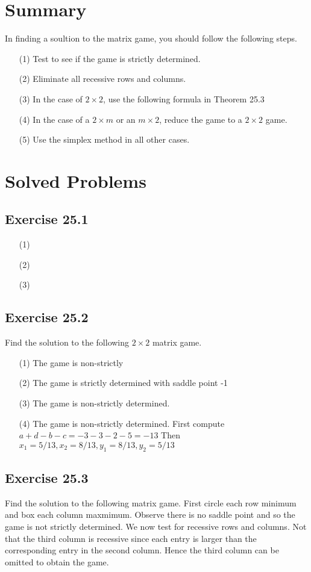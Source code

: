 \documentclass[]{report}
\begin{document}
\section{Summary}
In finding a soultion to the matrix game, you should follow the following steps.
\begin{itemize}
\item[(1)] Test to see if the game is strictly determined.
\item[(2)] Eliminate all recessive rows and columns.
\item[(3)] In the case of $2 \times 2$, use the following formula in Theorem 25.3
\item[(4)] In the case of a $2 \times m$ or an $m \times 2$, reduce the game to a $2 \times 2$ game.
\item[(5)] Use the simplex method in all other cases.
\end{itemize}
\section*{Solved Problems}
\subsection{Exercise 25.1}
\begin{itemize}
\item[(1)]
\item[(2)]
\item[(3)]
\end{itemize}
\subsection{Exercise 25.2}
Find the solution to the following $2 \times 2$ matrix game.
\begin{itemize}
\item[(1)] The game is non-strictly
\item[(2)] The game is strictly determined with saddle point -1
\item[(3)] The game is non-strictly determined.
\item[(4)] The game is non-strictly determined. First compute $a+d-b-c = -3-3-2-5 = -13$
Then $x_1 = 5/13, x_2 = 8/13,y_1=8/13,y_2=5/13$
\end{itemize}
\subsection{Exercise 25.3}
Find the solution to the following matrix game.
First circle each row minimum and box each column maxmimum.
Observe there is no saddle point and so the game is not strictly determined.
We now test for recessive rows and columns.
Not that the third column is recessive since each entry is larger than the corresponding entry in the
second column. Hence the third column can be omitted to obtain the game.
\end{document}
